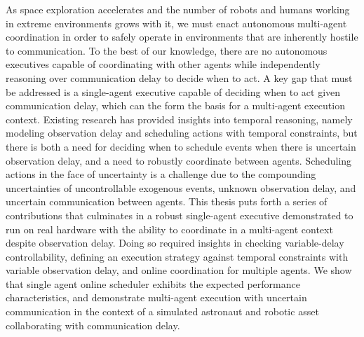 \documentclass[12pt,vi,leftblank,twoside]{mitthesis}
\begin{document}


\cleardoublepage
\setcounter{savepage}{\thepage}
\begin{abstractpage}

As space exploration accelerates and the number of robots and humans working in extreme environments
grows with it, we must enact autonomous multi-agent coordination in order to safely operate in
environments that are inherently hostile to communication. To the best of our knowledge, there are
no autonomous executives capable of coordinating with other agents while independently reasoning
over communication delay to decide when to act. A key gap that must be addressed is a single-agent
executive capable of deciding when to act given communication delay, which can the form the basis
for a multi-agent execution context. Existing research has provided insights into temporal
reasoning, namely modeling observation delay and scheduling actions with temporal constraints, but
there is both a need for deciding when to schedule events when there is uncertain observation delay,
and a need to robustly coordinate between agents. Scheduling actions in the face of uncertainty is a
challenge due to the compounding uncertainties of uncontrollable exogenous events, unknown
observation delay, and uncertain communication between agents. This thesis puts forth a series of
contributions that culminates in a robust single-agent executive demonstrated to run on real
hardware with the ability to coordinate in a multi-agent context despite observation delay. Doing so
required insights in checking variable-delay controllability, defining an execution strategy against
temporal constraints with variable observation delay, and online coordination for multiple agents.
We show that single agent online scheduler exhibits the expected performance characteristics, and
demonstrate multi-agent execution with uncertain communication in the context of a simulated
astronaut and robotic asset collaborating with communication delay.

\end{abstractpage}
\end{document}
